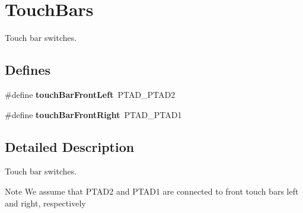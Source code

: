 \hypertarget{group__touch_bars}{
\section{\-Touch\-Bars}
\label{group__touch_bars}
}


\-Touch bar switches.  


\subsection*{\-Defines}
\begin{DoxyCompactItemize}
\item 
\hypertarget{group__touch_bars_gacecaf2a75e78f076f0aa3e7ef64e1d04}{
\#define {\bfseries touch\-Bar\-Front\-Left}~\-P\-T\-A\-D\-\_\-\-P\-T\-A\-D2}
\label{group__touch_bars_gacecaf2a75e78f076f0aa3e7ef64e1d04}

\item 
\hypertarget{group__touch_bars_gaf607ec03617ff68c5be4ea582763d116}{
\#define {\bfseries touch\-Bar\-Front\-Right}~\-P\-T\-A\-D\-\_\-\-P\-T\-A\-D1}
\label{group__touch_bars_gaf607ec03617ff68c5be4ea582763d116}

\end{DoxyCompactItemize}


\subsection{\-Detailed \-Description}
\-Touch bar switches. \begin{DoxyNote}{\-Note}
\-We assume that \-P\-T\-A\-D2 and \-P\-T\-A\-D1 are connected to front touch bars left and right, respectively 
\end{DoxyNote}
